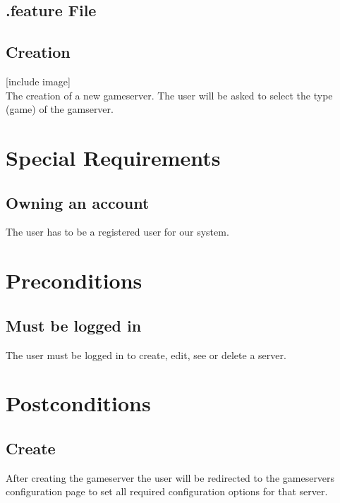 \documentclass[a4paper,12pt,chapterprefix=false,bibliography=totoc,listof=totoc,book]{scrreprt}
\begin{document}
\section{.feature File}
\begin{minipage}{\textwidth}

\end{minipage}

\section{Creation}
[include image]\\
The creation of a new gameserver. The user will be asked to select the type (game) of the gamserver.

\chapter{Special Requirements}

\section{Owning an account}
The user has to be a registered user for our system.

\chapter{Preconditions}
\section{Must be logged in}
The user must be logged in to create, edit, see or delete a server.

\chapter{Postconditions}

\section{Create}
After creating the gameserver the user will be redirected to the gameservers configuration page to set all required configuration options for that server.
\end{document}
